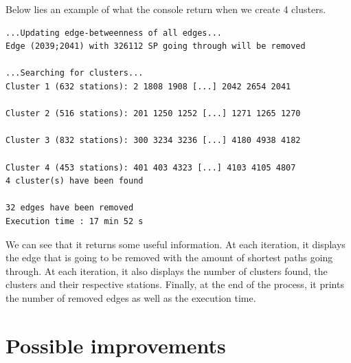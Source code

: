 \documentclass{article}
\begin{document}
\medbreak

Below lies an example of what the console return when we create 4 clusters.

\begin{verbatim}
...Updating edge-betweenness of all edges...
Edge (2039;2041) with 326112 SP going through will be removed

...Searching for clusters...
Cluster 1 (632 stations): 2 1808 1908 [...] 2042 2654 2041

Cluster 2 (516 stations): 201 1250 1252 [...] 1271 1265 1270

Cluster 3 (832 stations): 300 3234 3236 [...] 4180 4938 4182 

Cluster 4 (453 stations): 401 403 4323 [...] 4103 4105 4807 
4 cluster(s) have been found 

32 edges have been removed
Execution time : 17 min 52 s
\end{verbatim}

We can see that it returns some useful information. At each iteration, it displays the edge that is going to be removed with the amount of shortest paths going through. At each iteration, it also displays the number of clusters found, the clusters and their respective stations. Finally, at the end of the process, it prints the number of removed edges as well as the execution time.

\newpage

\section{Possible improvements}
\end{document}
